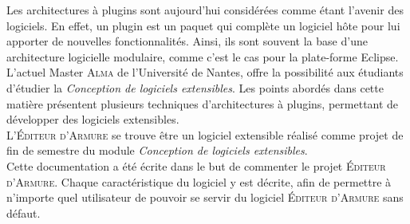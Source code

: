 

Les architectures à plugins sont aujourd'hui considérées comme étant l'avenir des logiciels. En effet, un plugin est un paquet qui complète un logiciel hôte pour lui apporter de nouvelles fonctionnalités. Ainsi, ils sont souvent la base d’une architecture logicielle modulaire, comme c’est le cas pour la plate-forme Eclipse.\\

L'actuel Master \textsc{Alma} de l’Université de Nantes, offre la possibilité aux étudiants d'étudier la \textit{Conception de logiciels extensibles}. Les points abordés dans cette matière présentent plusieurs techniques d'architectures à plugins, permettant de développer des logiciels extensibles. \\

L'\textsc{\'Editeur d'Armure} se trouve être un logiciel extensible réalisé comme projet de fin de semestre du module \textit{Conception de logiciels extensibles}.\\

Cette documentation a été écrite dans le but de commenter le projet \textsc{\'Editeur d'Armure}. Chaque caractéristique du logiciel y est décrite, afin de permettre à n’importe quel utilisateur de pouvoir se servir du logiciel \textsc{\'Editeur d'Armure} sans défaut.
